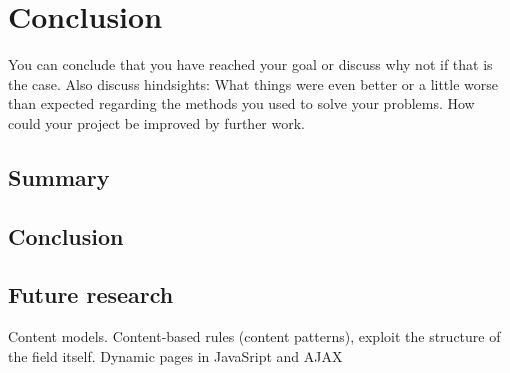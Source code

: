 \chapter{Conclusion}

You can conclude that you have reached your goal or discuss why not if that is the case. Also discuss hindsights: What things were even better or a little worse than expected regarding the methods you used to solve your problems. How could your project be improved by further work.

\section{Summary}

\section{Conclusion}

\section{Future research} %
\label{sec:section name}

Content models.
Content-based rules (content patterns), exploit the structure of the field itself.
Dynamic pages in JavaSript and AJAX


